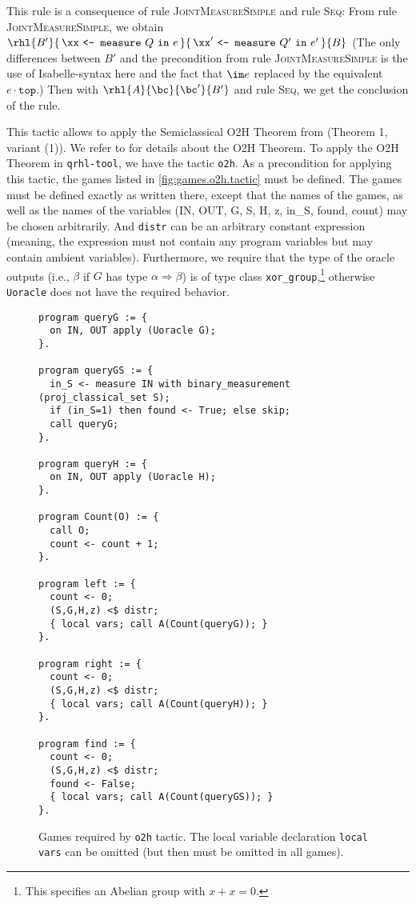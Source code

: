 \documentclass{article}
\renewcommand\ruleref[1]{rule \hbox{\textsc{#1}}}
\begin{document}
This rule is a consequence of \ruleref{JointMeasureSimple} and \ruleref{Seq}: 
From \ruleref{JointMeasureSimple}, we obtain 
$\rhl{B'}{\,\xx\ \texttt{<-\ measure}\ Q\ \mathtt{in}\ e \,}
{\,\xx'\ \texttt{<-\ measure}\ Q'\ \mathtt{in}\ e' \,}{B}$
(The only differences between $B'$ and the precondition from
\ruleref{JointMeasureSimple} is the use of Isabelle-syntax here
and the fact that $\im e$ replaced by the equivalent $e\cdot\mathtt{top}$.)
Then with $\rhl{A}{\bc}{\bc'}{B'}$
and \ruleref{Seq}, we get the conclusion of the rule.


This tactic allows to apply the Semiclassical O2H Theorem from
\cite{ambainis19semiclassical} (Theorem 1, variant (1)).  We refer to
\cite{ambainis19semiclassical} for details about the O2H Theorem.  To
apply the O2H Theorem in \texttt{qrhl-tool}, we have the tactic
\texttt{o2h}. As a precondition for applying this tactic, the games
listed in \autoref{fig:games.o2h.tactic} must be defined. The games
must be defined exactly as written there, except that the names of the
games, as well as the names of the variables (IN, OUT, G, S, H, z,
in\_S, found, count) may be chosen arbitrarily. And \texttt{distr} can
be an arbitrary constant expression (meaning, the expression must not
contain any program variables but may contain ambient variables).
Furthermore, we require that the type of the oracle outputs (i.e.,
$\beta$ if $G$ has type $\alpha\Rightarrow\beta$) is of type class
\texttt{xor\_group},\footnote{This specifies
  an Abelian group with $x+x=0$.} otherwise \texttt{Uoracle} does not have the required behavior.
%
\begin{figure}[t]
  {\smaller\smaller  \lstset{language=qrhl}
\begin{lstlisting}
program queryG := {
  on IN, OUT apply (Uoracle G);
}.

program queryGS := {
  in_S <- measure IN with binary_measurement (proj_classical_set S);
  if (in_S=1) then found <- True; else skip;
  call queryG;
}.

program queryH := {
  on IN, OUT apply (Uoracle H);
}.

program Count(O) := {
  call O;
  count <- count + 1;
}.

program left := {
  count <- 0;
  (S,G,H,z) <$ distr;
  { local vars; call A(Count(queryG)); }
}.

program right := {
  count <- 0;
  (S,G,H,z) <$ distr;
  { local vars; call A(Count(queryH)); }
}.

program find := {
  count <- 0;
  (S,G,H,z) <$ distr;
  found <- False;
  { local vars; call A(Count(queryGS)); }
}.
\end{lstlisting}
  }
  \caption[Games required by o2h tactic.]{\label{fig:games.o2h.tactic}Games required by \texttt{o2h} tactic.
    The local variable declaration \texttt{local vars} can be omitted (but then must be omitted in all games).}
\end{figure}
%
\end{document}
